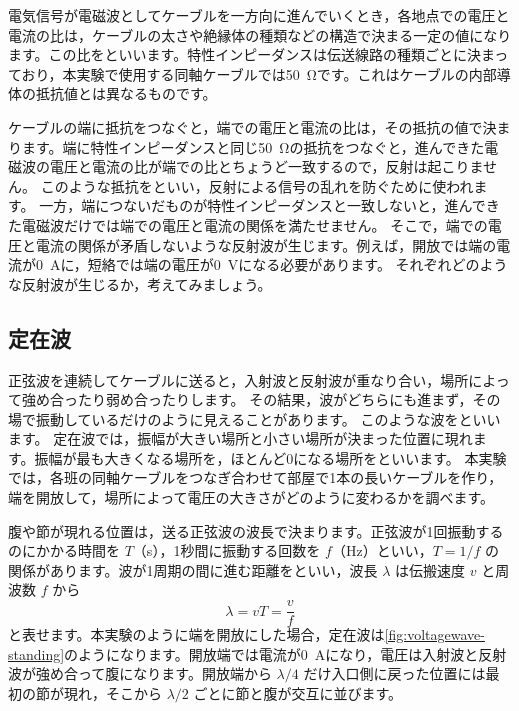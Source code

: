 \begin{hosoku}
電気信号が電磁波としてケーブルを一方向に進んでいくとき，各地点での電圧と電流の比は，ケーブルの太さや絶縁体の種類などの構造で決まる一定の値になります。この比をといいます。特性インピーダンスは伝送線路の種類ごとに決まっており，本実験で使用する同軸ケーブルでは\SI{50}{\ohm}です。これはケーブルの内部導体の抵抗値とは異なるものです。

ケーブルの端に抵抗をつなぐと，端での電圧と電流の比は，その抵抗の値で決まります。端に特性インピーダンスと同じ\SI{50}{\ohm}の抵抗をつなぐと，進んできた電磁波の電圧と電流の比が端での比とちょうど一致するので，反射は起こりません。
このような抵抗をといい，反射による信号の乱れを防ぐために使われます。
一方，端につないだものが特性インピーダンスと一致しないと，進んできた電磁波だけでは端での電圧と電流の関係を満たせません。
そこで，端での電圧と電流の関係が矛盾しないような反射波が生じます。例えば，開放では端の電流が\SI{0}{A}に，短絡では端の電圧が\SI{0}{V}になる必要があります。
それぞれどのような反射波が生じるか，考えてみましょう。
\end{hosoku}

\subsection{定在波}

正弦波を連続してケーブルに送ると，入射波と反射波が重なり合い，場所によって強め合ったり弱め合ったりします。
その結果，波がどちらにも進まず，その場で振動しているだけのように見えることがあります。
このような波をといいます。
定在波では，振幅が大きい場所と小さい場所が決まった位置に現れます。振幅が最も大きくなる場所を，ほとんど0になる場所をといいます。
本実験では，各班の同軸ケーブルをつなぎ合わせて部屋で1本の長いケーブルを作り，端を開放して，場所によって電圧の大きさがどのように変わるかを調べます。


腹や節が現れる位置は，送る正弦波の波長で決まります。正弦波が1回振動するのにかかる時間を $T$（s），1秒間に振動する回数を $f$（Hz）といい，$T=1/f$ の関係があります。波が1周期の間に進む距離をといい，波長 $\lambda$ は伝搬速度 $v$ と周波数 $f$ から
\begin{equation}
  \lambda = vT = \frac{v}{f}
  \label{eq:voltagewave-wavelength}
\end{equation}
と表せます。本実験のように端を開放にした場合，定在波は\cref{fig:voltagewave-standing}のようになります。開放端では電流が\SI{0}{A}になり，電圧は入射波と反射波が強め合って腹になります。開放端から $\lambda/4$ だけ入口側に戻った位置には最初の節が現れ，そこから $\lambda/2$ ごとに節と腹が交互に並びます。

